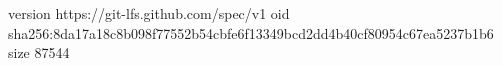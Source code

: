 version https://git-lfs.github.com/spec/v1
oid sha256:8da17a18c8b098f77552b54cbfe6f13349bcd2dd4b40cf80954c67ea5237b1b6
size 87544
